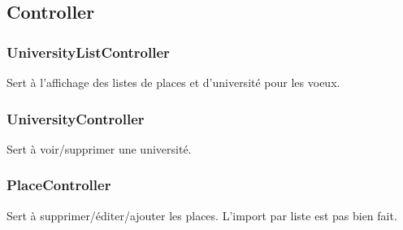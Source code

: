 \subsection{Controller}
\subsubsection{UniversityListController}
Sert à l'affichage des listes de places et d'université pour les voeux.

\subsubsection{UniversityController}
Sert à voir/supprimer une université. 

\subsubsection{PlaceController}
Sert à supprimer/éditer/ajouter les places.
L'import par liste est pas bien fait.